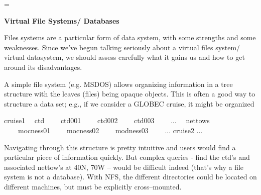 
%

%
%

\magnification=
\raggedbottom
\def\title#1{\bigskip\goodbreak\centerline{\bf #1}\medskip}
\def\section#1{\medskip\goodbreak\noindent{\bf #1}\medskip}
\def\subsection#1{\medskip\goodbreak\noindent{\sl #1}\medskip}
\def\references{\narrower\parindent=-20pt}
\def\jour#1#2{{\sl #1}, {\bf #2}}
\def\ni{\noindent}

\title{Virtual File Systems/ Databases}

Files systems are a particular form of data system, with some
strengths and some weaknesses. Since we've begun talking seriously
about a virtual files system/ virtual datasystem, we should assess
carefully what it gains us and how to get around its disadvantages.

\section{File Systems}

A simple file system (e.g. MSDOS) allows organizing information in a
tree structure with the leaves (files) being opaque objects. This is
often a good way to structure a data set; e.g., if we consider a
GLOBEC cruise, it might be organized

{\obeylines
cruise1
~~ctd
~~~~ctd001
~~~~ctd002
~~~~ctd003
~~~~...
~~nettows
~~~~mocness01
~~~~mocness02
~~~~modness03
~~~~...
cruise2
...
}

\ni Navigating through this structure is pretty intuitive and users would
find a particular piece of information quickly. But complex queries -
find the ctd's and associated nettow's at 40N, 70W -- would be difficult
indeed (that's why a file system is not a database). With NFS, the
different directories could be located on different machines, but must
be explicitly cross--mounted.

